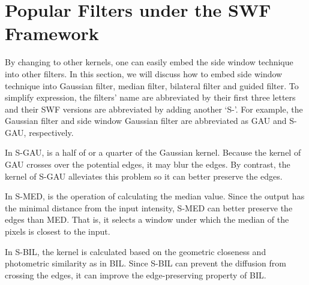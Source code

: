 \documentclass[10pt,twocolumn,letterpaper]{article}
\begin{document}
\section{Popular Filters under the SWF Framework}
By changing  to other kernels, one can easily embed the side window technique into other filters. In this section, we will discuss how to embed side window technique into Gaussian filter, median filter, bilateral filter and guided filter. To simplify expression, the filters' name are abbreviated by their first three letters and their SWF versions are abbreviated by adding another `S-'. For example, the Gaussian filter and side window Gaussian filter are abbreviated as GAU and S-GAU, respectively. 

In S-GAU,  is a half of or a quarter of the  Gaussian kernel. Because the kernel of GAU crosses over the potential edges, it may blur the edges. By contrast, the kernel of S-GAU alleviates this problem so it can better preserve the edges.

In S-MED,  is the operation of calculating the median value. Since the output has the minimal distance from the input intensity, S-MED can better preserve the edges than MED. That is, it selects a window under which the median of the pixels is closest to the input. 

In S-BIL, the kernel is calculated based on the geometric closeness and photometric similarity as in BIL. Since S-BIL can prevent the diffusion from crossing the edges, it can improve the edge-preserving property of BIL. 
\end{document}
